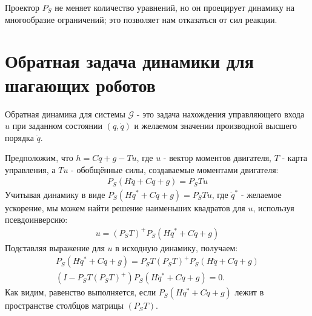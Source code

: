 Проектор ${P}_S$ не меняет количество уравнений, но он проецирует динамику на многообразие ограничений; это позволяет нам отказаться от сил реакции.
%
\section{Обратная задача динамики для шагающих роботов}\label{sec:ch2/sect4}
\cite{Righetti2011}
Обратная динамика для системы $\mathcal{G}$ - это задача нахождения управляющего входа ${u}$ при заданном состоянии $({q}, \dot{{q}})$ и желаемом значении производной высшего порядка $\ddot{{q}}$.
\begin{comment}
Динамика свободно плавающего робота с жёстким телом, подверженного внешним ограничениям, в общем случае задаётся следующим образом
\begin{equation}
	M \ddot{q} +h =S\T\tau + J_c\T \lambda,
\end{equation}
при $k$ ограничениях
\begin{equation}
	J_c \ddot{q} = b(q,\dot{q}),
\end{equation}
где $M \in \mathbb{R}^{n+6 \times n+6}$ - матрица инерции динамики жёсткого тела, $h \in \mathbb{R}^{n+6}$ - обобщённый вектор силы, содержащий эффекты Кориолиса, центробежные и гравитационные эффекты, $\tau \in \mathbb{R}^{n}$ - вектор воздействия и $S \in \mathbb{R}^{n \times n+6}$ - матрица выбора соединений, отражающая недостаточность действия - например, для большинства роботов с плавающей базой S будет матрицей тождества в первой подматрице $n \times n$, а в остальных местах - нули. 
$J_c \in \mathbb{R}^{k \times n+6}$ - Якобиан $k$ ограничений c $\lambda \in \mathbb{R}^{k}$ множителями Лагранжа, соответствующих ограничивающим силам.
\end{comment}
Предположим, что ${h} = {C}\dot{{q}} + {g} - {T}{u}$, где ${u}$ - вектор моментов двигателя, ${T}$ - карта управления, а ${T}{u}$ - обобщённые силы, создаваемые моментами двигателя:
%
\begin{align}
	{P}_S({H}\ddot{{q}} + {C}\dot{{q}}+ {g}) = {P}_S{T}{u}
\end{align}
%
Учитывая динамику в виде ${P}_S({H}\ddot{{q}}^* + {C}\dot{{q}}+ {g}) = {P}_S{T}{u}$, где $\ddot{{q}}^*$ - желаемое ускорение, мы можем найти решение наименьших квадратов для ${u}$, используя псевдоинверсию:
%
\begin{align}
	{u}
	=
	({P}_S{T})^+{P}_S({H}\ddot{{q}}^* + {C}\dot{{q}}+ {g})
\end{align}
%
Подставляя выражение для ${u}$ в исходную динамику, получаем:
%
\begin{align}
	{P}_S({H}\ddot{{q}}^* + {C}\dot{{q}}+ {g}) = {P}_S{T}({P}_S{T})^+{P}_S({H}\ddot{{q}} + {C}\dot{{q}}+ {g})
	\\
	({I}-{P}_S{T}({P}_S{T})^+){P}_S({H}\ddot{{q}}^* + {C}\dot{{q}}+ {g}) = 0.
\end{align}
Как видим, равенство выполняется, если ${P}_S({H}\ddot{{q}}^* + {C}\dot{{q}}+ {g})$ лежит в пространстве столбцов матрицы $({P}_S{T})$.

